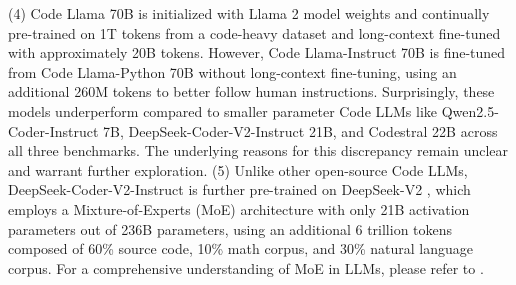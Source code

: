 (4) Code Llama 70B is initialized with Llama 2 model weights and continually pre-trained on 1T tokens from a code-heavy dataset and long-context fine-tuned with approximately 20B tokens. However, Code Llama-Instruct 70B is fine-tuned from Code Llama-Python 70B without long-context fine-tuning, using an additional 260M tokens to better follow human instructions. 
Surprisingly, these models underperform compared to smaller parameter Code LLMs like Qwen2.5-Coder-Instruct 7B, DeepSeek-Coder-V2-Instruct 21B, and Codestral 22B across all three benchmarks. The underlying reasons for this discrepancy remain unclear and warrant further exploration.
(5) Unlike other open-source Code LLMs, DeepSeek-Coder-V2-Instruct is further pre-trained on DeepSeek-V2 \cite{liu2024deepseek}, which employs a Mixture-of-Experts (MoE) architecture with only 21B activation parameters out of 236B parameters, using an additional 6 trillion tokens composed of 60\% source code, 10\% math corpus, and 30\% natural language corpus. For a comprehensive understanding of MoE in LLMs, please refer to \cite{cai2024survey}.




